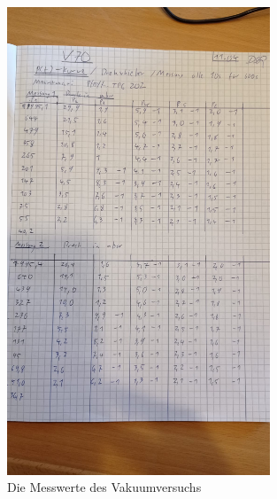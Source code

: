 \begin{figure}[h]
    \centering
    \includegraphics[width=0.7\textwidth]{latex/images/Messwerte_1.jpeg}
    \caption{Die Messwerte des Vakuumversuchs}
\end{figure}

